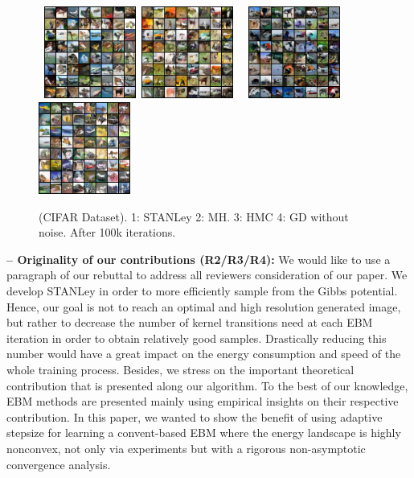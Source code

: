 \documentclass[10pt,twocolumn,letterpaper]{article}
\begin{document}
\begin{figure}[t]
\begin{center}
    \mbox{
        \includegraphics[width=1.19in]{figs/cifaranila}
        \includegraphics[width=1.19in]{figs/mh_x_q_099900}
        }\vspace{0.05in}
            \mbox{
                \includegraphics[width=1.19in]{figs/hmc_x_q_099900}
                        \includegraphics[width=1.19in]{figs/gd_x_q_099900}
        }
\end{center}
\caption{(CIFAR Dataset). 1: STANLey 2: MH. 3: HMC 4: GD without noise. After 100k iterations.}
	\label{fig:cifarmore}
\end{figure}


\noindent \textbf{-- Originality of our contributions (R2/R3/R4):}
We would like to use a paragraph of our rebuttal to address all reviewers consideration of our paper.
We develop STANLey in order to more efficiently sample from the Gibbs potential. Hence, our goal is not to reach an optimal and high resolution generated image, but rather to decrease the number of kernel transitions need at each EBM iteration in order to obtain relatively good samples.
Drastically reducing this number would have a great impact on the energy consumption and speed of the whole training process.
Besides, we stress on the important theoretical contribution that is presented along our algorithm. 
To the best of our knowledge, EBM methods are presented mainly using empirical insights on their respective contribution.
In this paper, we wanted to show the benefit of using adaptive stepsize for learning a convent-based EBM where the energy landscape is highly nonconvex, not only via experiments but with a rigorous non-asymptotic convergence analysis.
\end{document}
